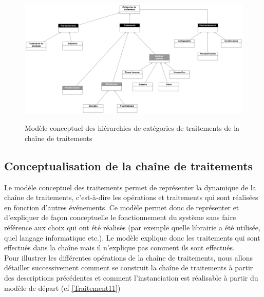 \begin{figure}[H]
\begin{center}
\includegraphics[width=16cm]{ModeleTraitements2}\\
\caption{\label{ModeleTraitements} Modèle conceptuel des hiérarchies de catégories de traitements de la chaîne de traitements}
\end{center}
\end{figure}



\subsection{Conceptualisation de la chaîne de traitements}

Le modèle conceptuel des traitements permet de représenter la dynamique de la chaîne de traitements, c'est-à-dire les opérations et traitements qui sont réalisées en fonction d'autres événements. 
Ce modèle permet donc de représenter et d'expliquer de façon conceptuelle le fonctionnement du système sans faire référence aux choix qui ont été réalisés (par exemple quelle librairie a été utilisée, quel langage informatique etc.). Le modèle explique donc les traitements qui sont effectués dans la chaîne mais il n'explique pas comment ils sont effectués.  \\

Pour illustrer les différentes opérations de la chaîne de traitements, nous allons détailler successivement comment se construit la chaîne de traitements à partir des descriptions précédentes et comment l'instanciation est réalisable à partir du modèle de départ (cf \ref{Traitement11})\\




